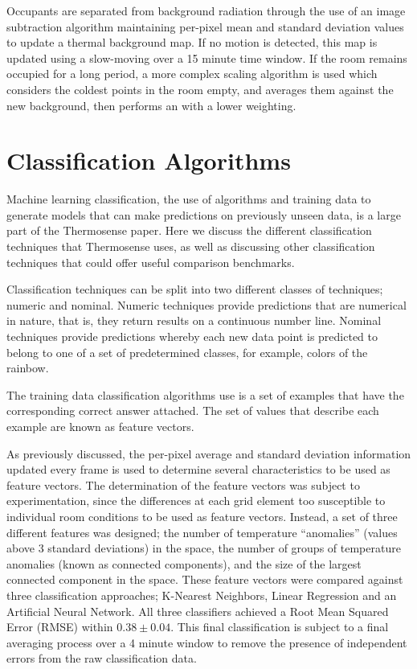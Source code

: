 \documentclass[../thesis/thesis.tex]{subfiles}
\begin{document}
Occupants are separated from background radiation through the use of an image subtraction algorithm maintaining per-pixel mean and standard deviation values to update a thermal background map. If no motion is detected, this map is updated using a slow-moving \emwa over a 15 minute time window. If the room remains occupied for a long period, a more complex scaling algorithm is used which considers the coldest points in the room empty, and averages them against the new background, then performs an \emwa with a lower weighting.

\section{Classification Algorithms}
\label{sec:classification}
Machine learning classification, the use of algorithms and training data to generate models that can make predictions on previously unseen data, is a large part of the Thermosense paper. Here we discuss the different classification techniques that Thermosense uses, as well as discussing other classification techniques that could offer useful comparison benchmarks.

Classification techniques can be split into two different classes of techniques; numeric and nominal. Numeric techniques provide predictions that are numerical in nature, that is, they return results on a continuous number line. Nominal techniques provide predictions whereby each new data point is predicted to belong to one of a set of predetermined classes, for example, colors of the rainbow.

The training data classification algorithms use is a set of examples that have the corresponding correct answer attached. The set of values that describe each example are known as feature vectors.

As previously discussed, the per-pixel average and standard deviation information updated every frame is used to determine several characteristics to be used as feature vectors. The determination of the feature vectors was subject to experimentation, since the differences at each grid element too susceptible to individual room conditions to be used as feature vectors. Instead, a set of three different features was designed; the number of temperature ``anomalies'' (values above 3 standard deviations) in the space, the number of groups of temperature anomalies (known as connected components), and the size of the largest connected component in the space. These feature vectors were compared against three classification approaches; K-Nearest Neighbors, Linear Regression and an Artificial Neural Network. All three classifiers achieved a Root Mean Squared Error (RMSE) within $0.38\pm0.04$. This final classification is subject to a final averaging process over a 4 minute window to remove the presence of independent errors from the raw classification data.
\end{document}
